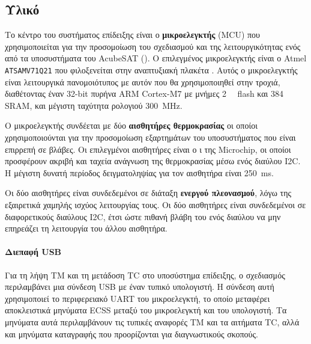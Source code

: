 \documentclass[a4paper,nobib]{tufte-book}
\begin{document}
\subsection{Υλικό}

Το κέντρο του συστήματος επίδειξης είναι ο \textbf{μικροελεγκτής} (\ac{MCU}) που χρησιμοποιείται για την προσομοίωση του σχεδιασμού και της λειτουργικότητας ενός από τα υποσυστήματα του AcubeSAT (). Ο επιλεγμένος μικροελεγκτής είναι ο Atmel \texttt{ATSAMV71Q21} που φιλοξενείται στην αναπτυξιακή πλακέτα . Αυτός ο μικροελεγκτής είναι λειτουργικά πανομοιότυπος με αυτόν που θα χρησιμοποιηθεί στην τροχιά, διαθέτοντας έναν 32-bit πυρήνα ARM Cortex-M7 με μνήμες \SI{2}{\mebi\byte} flash και \SI{384}{\kibi\byte} \acs{SRAM}, και μέγιστη ταχύτητα ρολογιού \SI{300}{\mega\hertz}.

Ο μικροελεγκτής συνδέεται με δύο \textbf{αισθητήρες θερμοκρασίας} οι οποίοι χρησιμοποιούνται για την προσομοίωση εξαρτημάτων του υποσυστήματος που είναι επιρρεπή σε βλάβες. Οι επιλεγμένοι αισθητήρες είναι ο ι της Microchip, οι οποίοι προσφέρουν ακριβή και ταχεία ανάγνωση της θερμοκρασίας μέσω ενός διαύλου \ac{I2C}. Η μέγιστη δυνατή περίοδος δειγματοληψίας για τον αισθητήρα είναι \SI{250}{\milli\second}.


Οι δύο αισθητήρες είναι συνδεδεμένοι σε διάταξη \textbf{ενεργού πλεονασμού}, λόγω της εξαιρετικά χαμηλής ισχύος λειτουργίας τους. Οι δύο αισθητήρες είναι συνδεδεμένοι σε διαφορετικούς διαύλους \ac{I2C}, έτσι ώστε πιθανή βλάβη του ενός διαύλου να μην επηρεάζει τη λειτουργία του άλλου αισθητήρα.

\paragraph{Διεπαφή \acs{USB}} Για τη λήψη \acl{TM} και τη μετάδοση \acl{TC} στο υποσύστημα επίδειξης, ο σχεδιασμός περιλαμβάνει μια σύνδεση \acl{USB} με έναν τυπικό υπολογιστή. Η σύνδεση αυτή χρησιμοποιεί το περιφερειακό \acs{UART} του μικροελεγκτή, το οποίο μεταφέρει αποκλειστικά μηνύματα \acs{ECSS} μεταξύ του μικροελεγκτή και του υπολογιστή. Τα μηνύματα αυτά περιλαμβάνουν τις τυπικές αναφορές \acs{TM} και τα αιτήματα \acs{TC}, αλλά και μηνύματα καταγραφής που προορίζονται για διαγνωστικούς σκοπούς.
\end{document}
